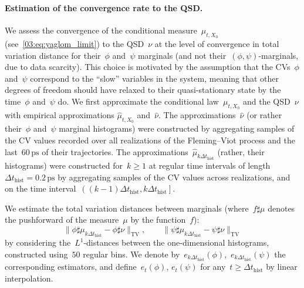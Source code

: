 \paragraph{Estimation of the convergence rate to the QSD.}
We assess the convergence of the conditional measure~$\mu_{t,X_0}$ (see~\eqref{03:eq:yaglom_limit}) to the QSD~$\nu$ at the level of convergence in total variation distance for their~$\phi$ and~$\psi$ marginals (and not their~$(\phi,\psi)$-marginals, due to data scarcity). This choice is motivated by the assumption that the CVs~$\phi$ and~$\psi$ correspond to the ``slow'' variables in the system, meaning that other degrees of freedom should have relaxed to their quasi-stationary state by the time~$\phi$ and~$\psi$ do. We first approximate the conditional law~$\mu_{t,X_0}$ and the QSD~$\nu$ with empirical approximations $\widehat{\mu}_{t,X_0}$ and~$\widehat{\nu}$.
The approximations~$\widehat{\nu}$ (or rather their~$\phi$ and~$\psi$ marginal histograms) were constructed by aggregating samples of the CV values recorded over all realizations of the Fleming--Viot process and the last~$60\,\mathrm{ps}$ of their trajectories.
The approximations~$\widehat{\mu}_{k\Delta t_{\mathrm{hist}}}$ (rather, their histograms) were constructed for~$k\geq 1$ at regular time intervals of length~$\Delta t_{\mathrm{hist}}=0.2\,\mathrm{ps}$ by aggregating samples of the CV values across realizations, and on the time interval~$\left((k-1)\Delta t_{\mathrm{hist}},k\Delta t_{\mathrm{hist}}\right]$.

We estimate the total variation distances between marginals (where~$f\sharp\mu$ denotes the pushforward of the measure~$\mu$ by the function~$f$):
$$\|\phi\sharp\mu_{k\Delta t_{\mathrm{hist}}}-\phi\sharp\nu\|_{\mathrm{TV}},\qquad\|\psi\sharp\mu_{k\Delta t_{\mathrm{hist}}}-\psi\sharp\nu\|_{\mathrm{TV}}$$
by considering the~$L^1$-distances between the one-dimensional histograms, constructed using~$50$ regular bins. We denote by~$e_{k\Delta t_{\mathrm{hist}}}(\phi)$,~$e_{k\Delta t_{\mathrm{hist}}}(\psi)$ the corresponding estimators, and define~$e_t(\phi),\,e_t(\psi)$ for any~$t\geq \Delta t_{\mathrm{hist}}$ by linear interpolation.

